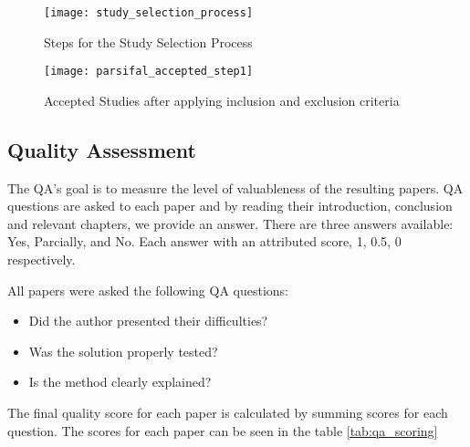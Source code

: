 \begin{figure}[h]
    \centering
    \texttt{[image: study\_selection\_process]}
    \caption{Steps for the Study Selection Process}
    \label{fig:study_selection_process}
  \end{figure}

\begin{figure}[h]
  \centering
  \texttt{[image: parsifal\_accepted\_step1]}
  \caption{Accepted Studies after applying inclusion and exclusion criteria}
  \label{fig:parsifal_accepted_step1}
\end{figure}

\subsection{Quality Assessment}
The QA's goal is to measure the level of valuableness of the resulting papers. QA questions are asked to each paper and by reading their introduction, conclusion and relevant chapters, we provide 
an answer. There are three answers available: Yes, Parcially, and No. Each answer with an attributed score, 1, 0.5, 0 respectively. 

All papers were asked the following QA questions:
\begin{itemize}
  \item Did the author presented their difficulties?
  \item Was the solution properly tested?
  \item Is the method clearly explained? 
\end{itemize}

The final quality score for each paper is calculated by summing scores for each question. The scores for each paper can be seen in the table \ref{tab:qa_scoring}

